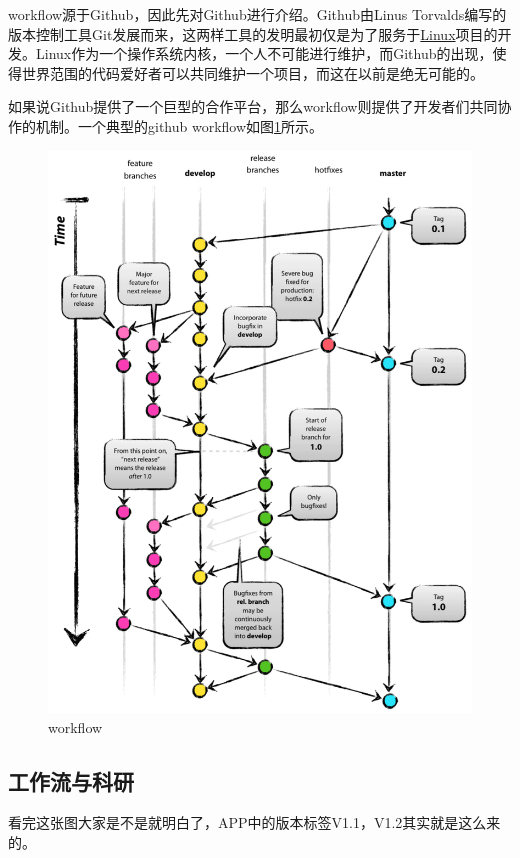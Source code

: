 \documentclass[UTF8,oneside]{ctexbook}
\begin{document}
workflow源于Github，因此先对Github进行介绍。Github由Linus Torvalds编写的版本控制工具Git发展而来，这两样工具的发明最初仅是为了服务于\href{https://github.com/torvalds/linux}{Linux}项目的开发。Linux作为一个操作系统内核，一个人不可能进行维护，而Github的出现，使得世界范围的代码爱好者可以共同维护一个项目，而这在以前是绝无可能的。

如果说Github提供了一个巨型的合作平台，那么workflow则提供了开发者们共同协作的机制。一个典型的github workflow如图\ref{fig:workflow}所示。

\begin{figure}[!htb]
	\centering
	\includegraphics[width=1\linewidth]{Figure/workflow.pdf}
	\vspace{-0.3cm}
	\caption{workflow}\label{fig:workflow}
\end{figure}

\subsection{工作流与科研}
看完这张图大家是不是就明白了，APP中的版本标签V1.1，V1.2其实就是这么来的。
\end{document}

